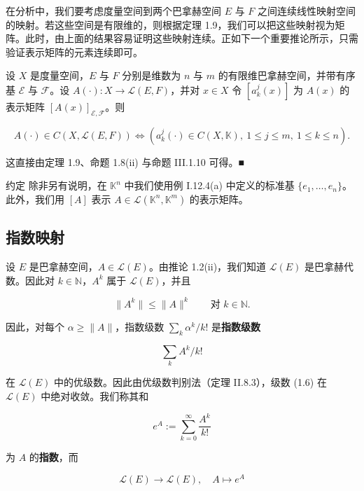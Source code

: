 在分析中，我们要考虑度量空间到两个巴拿赫空间 $ E $ 与 $ F $ 之间连续线性映射空间的映射。若这些空间是有限维的，则根据定理 1.9，我们可以把这些映射视为矩阵。此时，由上面的结果容易证明这些映射连续。正如下一个重要推论所示，只需验证表示矩阵的元素连续即可。

\begin{corollary}

设 $ X $ 是度量空间，$ E $ 与 $ F $ 分别是维数为 $ n $ 与 $ m $ 的有限维巴拿赫空间，并带有序基 $ \mathcal{E} $ 与 $ \mathcal{F} $。设 $ A(\cdot) : X \to \mathcal{L}(E, F) $，并对 $ x \in X $ 令 $ [a_{k}^{j}(x)] $ 为 $ A(x) $ 的表示矩阵 $ [A(x)]_{\mathcal{E},\mathcal{F}} $。则

\[
A(\cdot) \in C(X, \mathcal{L}(E, F)) \iff \left( a_{k}^{j}(\cdot) \in C(X, \mathbb{K}),\ 1 \le j \le m,\ 1 \le k \le n \right) .
\]

\proofhead
这直接由定理 1.9、命题 1.8(ii) 与命题 III.1.10 可得。\nobreak\hspace{0.35em}■
\end{corollary}

约定 除非另有说明，在 $ \mathbb{K}^{n} $ 中我们使用例 I.12.4(a) 中定义的标准基 $ \{e_{1}, \ldots, e_{n}\} $。此外，我们用 $ [A] $ 表示 $ A \in \mathcal{L}(\mathbb{K}^{n}, \mathbb{K}^{m}) $ 的表示矩阵。

\subsection*{指数映射}

设 $ E $ 是巴拿赫空间，$ A \in \mathcal{L}(E) $。由推论 1.2(ii)，我们知道 $ \mathcal{L}(E) $ 是巴拿赫代数。因此对 $ k \in \mathbb{N} $，$ A^{k} $ 属于 $ \mathcal{L}(E) $，并且

\[
\|A^{k}\| \le \|A\|^{k} \qquad \text{对 } k \in \mathbb{N} .
\]

因此，对每个 $ \alpha \ge \|A\| $，指数级数 $ \sum_{k} \alpha^{k}/k! $ 是\textbf{指数级数}

\begin{equation}
\sum_{k} A^{k}/k!\tag{1.6}
\end{equation}

在 $ \mathcal{L}(E) $ 中的优级数。因此由优级数判别法（定理 II.8.3），级数 (1.6) 在 $ \mathcal{L}(E) $ 中绝对收敛。我们称其和

\[
e^{A} := \sum_{k=0}^{\infty} \frac{A^{k}}{k!}
\]

为 $ A $ 的\textbf{指数}，而

\[
\mathcal{L}(E) \to \mathcal{L}(E) , \quad A \mapsto e^{A}
\]


